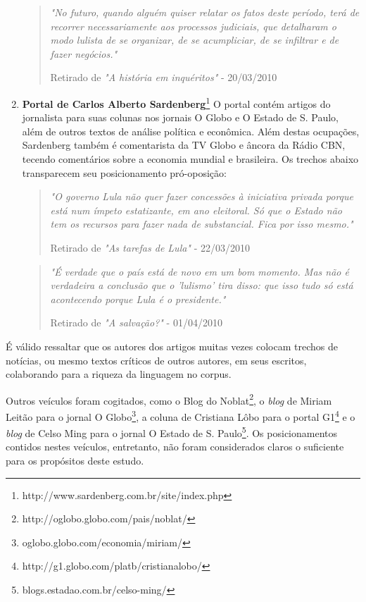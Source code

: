 \begin{enumerate}
\begin{quote}

\emph{"No futuro, quando alguém quiser relatar os fatos deste período, terá de recorrer necessariamente aos processos judiciais, que detalharam o modo lulista de se organizar, de se acumpliciar, de se infiltrar e de fazer negócios."}

{\small Retirado de \emph{"A história em inquéritos"} - 20/03/2010}
\end{quote}

\item \textbf{Portal de Carlos Alberto Sardenberg}\footnote{http://www.sardenberg.com.br/site/index.php} O portal contém artigos do jornalista para suas colunas nos jornais O Globo e O Estado de S. Paulo, além de outros textos de análise política e econômica. Além destas ocupações, Sardenberg também é comentarista da TV Globo e âncora da Rádio CBN, tecendo comentários sobre a economia mundial e brasileira. Os trechos abaixo transparecem seu posicionamento pró-oposição: 

\begin{quote}

\emph{"O governo Lula não quer fazer concessões à iniciativa privada porque está num ímpeto estatizante, em ano eleitoral. Só que o Estado não tem os recursos para fazer nada de substancial. Fica por isso mesmo."}

{\small Retirado de \emph{"As tarefas de Lula"} - 22/03/2010}
\end{quote}

\begin{quote}

\emph{"É verdade que o país está de novo em um bom momento. Mas não é verdadeira a conclusão que o 'lulismo' tira disso: que isso tudo só está acontecendo porque Lula é o presidente."}

{\small Retirado de \emph{"A salvação?"} - 01/04/2010}
\end{quote}
\end{enumerate}

É válido ressaltar que os autores dos artigos muitas vezes colocam trechos de notícias, ou mesmo textos críticos de outros autores, em seus escritos, colaborando para a riqueza da linguagem no corpus.

Outros veículos foram cogitados, como o Blog do Noblat\footnote{http://oglobo.globo.com/pais/noblat/}, o \emph{blog} de Miriam Leitão para o jornal O Globo\footnote{oglobo.globo.com/economia/miriam/}, a coluna de Cristiana Lôbo para o portal G1\footnote{http://g1.globo.com/platb/cristianalobo/} e o \emph{blog} de Celso Ming para o jornal O Estado de S. Paulo\footnote{blogs.estadao.com.br/celso-ming/ }. Os posicionamentos contidos nestes veículos, entretanto, não foram considerados claros o suficiente para os propósitos deste estudo. 

